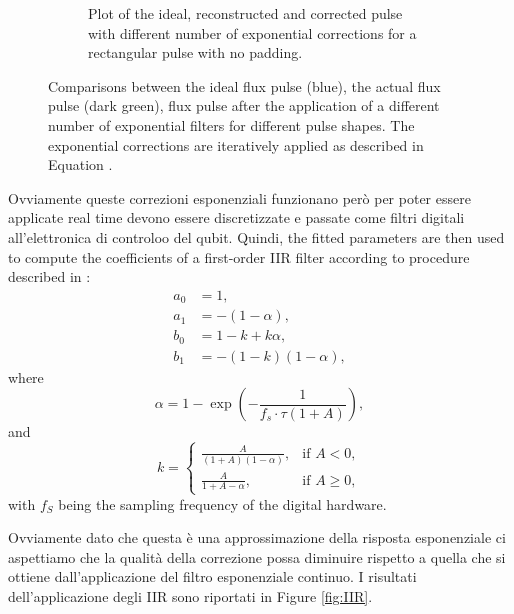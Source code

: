 \begin{figure}[h!]
\begin{subfigure}[t]{0.65\textwidth}
        \caption{Plot of the ideal, reconstructed and corrected pulse with different number of exponential corrections for a rectangular pulse with no padding.}
        \label{fig:5inverse:no_pad}
    \end{subfigure}
    
    \caption{Comparisons between the ideal flux pulse (blue), the actual flux pulse (dark green), flux pulse after the application of a different number of exponential filters for different pulse shapes.
    The exponential corrections are iteratively applied as described in Equation \label{eq:inverse}.}
    \label{fig:5inverse_short}
\end{figure} 

Ovviamente queste correzioni esponenziali funzionano però per poter essere applicate real time devono essere discretizzate e passate come filtri digitali all'elettronica di controloo del qubit.
Quindi, the fitted parameters are then used to compute the coefficients of a first-order IIR filter according to procedure described in \cite{rol_time-domain_2020}:
\begin{align}
    a_0 &= 1, \\
    a_1 &= -(1 - \alpha), \\
    b_0 &= 1 - k + k \alpha, \\
    b_1 &= -(1 - k)(1 - \alpha),
\end{align}
where 
\begin{equation}
\alpha = 1 - \exp\left(-\frac{1}{f_s \cdot \tau (1 + A)}\right),
\end{equation}
and
\begin{equation}
    k =
    \begin{cases}
    \frac{A}{(1 + A)(1 - \alpha)}, & \text{if } A < 0, \\
    \frac{A}{1 + A - \alpha}, & \text{if } A \geq 0,
    \end{cases}
\end{equation}
with $f_S$ being the sampling frequency of the digital hardware.

Ovviamente dato che questa è una approssimazione della risposta esponenziale ci aspettiamo che la qualità della correzione possa diminuire rispetto a quella che si ottiene dall'applicazione del filtro esponenziale continuo.
I risultati dell'applicazione degli IIR sono riportati in Figure \ref{fig:IIR}.

